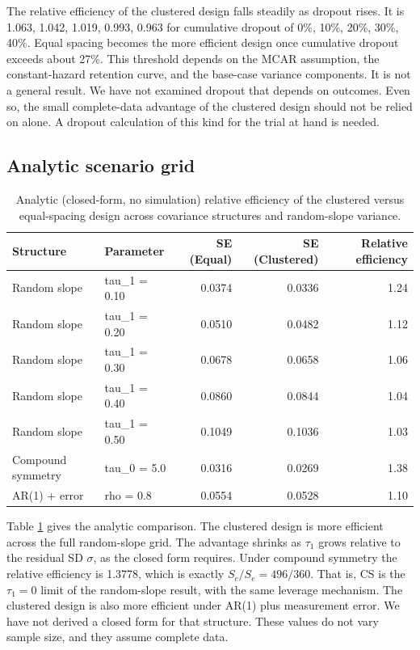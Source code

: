 \documentclass[
  11pt,
]{article}
\begin{document}
The relative efficiency of the clustered design falls steadily as
dropout rises. It is 1.063, 1.042, 1.019, 0.993, 0.963 for cumulative dropout of
0\%, 10\%, 20\%, 30\%, 40\%. Equal spacing becomes the more efficient
design once cumulative dropout exceeds about
27\%. This threshold depends on
the MCAR assumption, the constant-hazard retention curve, and the
base-case variance components. It is not a general result. We
have not examined dropout that depends on outcomes. Even so, the
small complete-data advantage of the clustered design should not
be relied on alone. A dropout calculation of this kind for the
trial at hand is needed.

\subsection{Analytic scenario grid}\label{analytic-scenario-grid}

\begin{table}[!h]
\centering
\caption{\label{tab:scenario-grid}Analytic (closed-form, no simulation) relative efficiency of the clustered versus equal-spacing design across covariance structures and random-slope variance.}
\centering
\fontsize{9}{11}\selectfont
\begin{tabular}[t]{llrrr}
\toprule
Structure & Parameter & SE (Equal) & SE (Clustered) & Relative efficiency\\
\midrule
Random slope & tau\_1 = 0.10 & 0.0374 & 0.0336 & 1.24\\
Random slope & tau\_1 = 0.20 & 0.0510 & 0.0482 & 1.12\\
Random slope & tau\_1 = 0.30 & 0.0678 & 0.0658 & 1.06\\
Random slope & tau\_1 = 0.40 & 0.0860 & 0.0844 & 1.04\\
Random slope & tau\_1 = 0.50 & 0.1049 & 0.1036 & 1.03\\
\addlinespace
Compound symmetry & tau\_0 = 5.0 & 0.0316 & 0.0269 & 1.38\\
AR(1) + error & rho = 0.8 & 0.0554 & 0.0528 & 1.10\\
\bottomrule
\end{tabular}
\end{table}

Table \ref{tab:scenario-grid} gives the analytic comparison. The
clustered design is more efficient across the full random-slope
grid. The advantage shrinks as \(\tau_1\) grows relative to the
residual SD \(\sigma\), as the closed form requires. Under compound
symmetry the relative efficiency is
1.3778, which is exactly
\(S_c / S_e = 496 / 360\). That is, CS is the
\(\tau_1 = 0\) limit of the random-slope result, with the same
leverage mechanism. The clustered design is also more efficient
under AR(1) plus measurement error. We have not derived a closed
form for that structure. These values do not vary sample size,
and they assume complete data.
\end{document}
